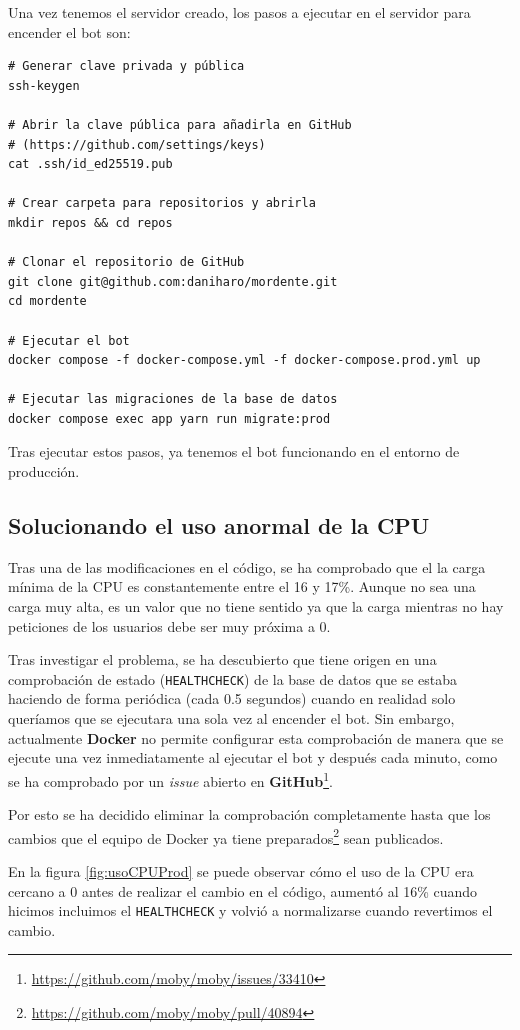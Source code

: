 Una vez tenemos el servidor creado, los pasos a ejecutar en el servidor para encender el bot son:

\begin{verbatim}
# Generar clave privada y pública
ssh-keygen

# Abrir la clave pública para añadirla en GitHub
# (https://github.com/settings/keys)
cat .ssh/id_ed25519.pub

# Crear carpeta para repositorios y abrirla
mkdir repos && cd repos

# Clonar el repositorio de GitHub
git clone git@github.com:daniharo/mordente.git
cd mordente

# Ejecutar el bot
docker compose -f docker-compose.yml -f docker-compose.prod.yml up

# Ejecutar las migraciones de la base de datos
docker compose exec app yarn run migrate:prod
\end{verbatim}

Tras ejecutar estos pasos, ya tenemos el bot funcionando en el entorno de producción.

\subsection{Solucionando el uso anormal de la CPU}

Tras una de las modificaciones en el código, se ha comprobado que el la carga mínima de la CPU es constantemente entre el 16 y 17\%. Aunque no sea una carga muy alta, es un valor que no tiene sentido ya que la carga mientras no hay peticiones de los usuarios debe ser muy próxima a 0.

Tras investigar el problema, se ha descubierto que tiene origen en una comprobación de estado (\texttt{HEALTHCHECK}) de la base de datos que se estaba haciendo de forma periódica (cada 0.5 segundos) cuando en realidad solo queríamos que se ejecutara una sola vez al encender el bot. Sin embargo, actualmente \textbf{Docker} no permite configurar esta comprobación de manera que se ejecute una vez inmediatamente al ejecutar el bot y después cada minuto, como se ha comprobado por un \textit{issue} abierto en \textbf{GitHub}\footnote{\url{https://github.com/moby/moby/issues/33410}}.

Por esto se ha decidido eliminar la comprobación completamente hasta que los cambios que el equipo de Docker ya tiene preparados\footnote{\url{https://github.com/moby/moby/pull/40894}} sean publicados.

En la figura \ref{fig:usoCPUProd} se puede observar cómo el uso de la CPU era cercano a 0 antes de realizar el cambio en el código, aumentó al 16\% cuando hicimos incluimos el \texttt{HEALTHCHECK} y volvió a normalizarse cuando revertimos el cambio.

